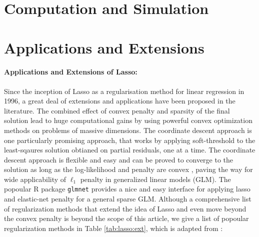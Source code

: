 \documentclass[11pt]{article}
\numberwithin{equation}{section}
\begin{document}

\section{Computation and Simulation}


\section{Applications and Extensions}


\paragraph{Applications and Extensions of Lasso:} Since the inception of Lasso as a regularisation method for linear regression in 1996, a great deal of extensions and applications have been proposed in the literature. The combined effect of convex penalty and sparsity of the final solution lead to huge computational gains by using powerful convex optimization methods on problems of massive dimensions. The coordinate descent approach \citep{friedman2007pathwise,friedman2010regularization} is one particularly promising approach, that works by applying soft-threshold to the least-sqaures solution obtianed on partial residuals, one at a time. The coordinate descent approach is flexible and easy and can be proved to converge to the solution as long as the log-likelihood and penalty are convex \citep{tseng2001convergence}, paving the way for wide applicability of $\ell_1$ penalty in generalized linear models (GLM). The popoular R package \texttt{glmnet} provides a nice and easy interface for applying lasso and elastic-net penalty for a general sparse GLM. Although a comprehensive list of regularization methods that extend the idea of Lasso and even move beyond the convex penalty is beyond the scope of this article, we give a list of popoular regularization methods in Table \ref{tab:lasso:ext}, which is adapted from \citet{tibshirani2014praise}:
\end{document}
